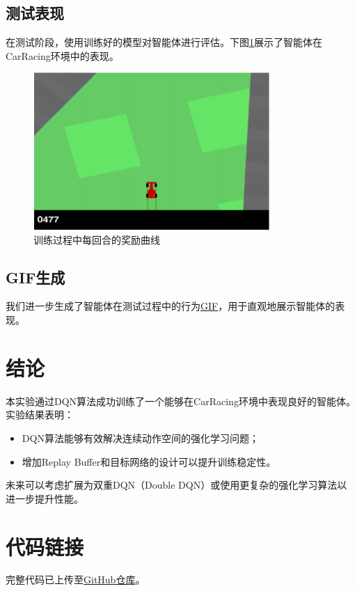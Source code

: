 \documentclass{article}
\begin{document}
\subsection{测试表现}
在测试阶段，使用训练好的模型对智能体进行评估。下图\ref{fig:car_racing_example}展示了智能体在CarRacing环境中的表现。
\begin{figure}[h!]
    \centering
    \includegraphics[width=0.8\textwidth]{./image/Figure_2.png}
    \caption{训练过程中每回合的奖励曲线}
    \label{fig:car_racing_example}
\end{figure}

\subsection{GIF生成}
我们进一步生成了智能体在测试过程中的行为\href{https://github.com/KFCCrazzzyThursday/rl_and_game_theory/blob/main/car_racing.gif}{GIF}，用于直观地展示智能体的表现。
\section{结论}
本实验通过DQN算法成功训练了一个能够在CarRacing环境中表现良好的智能体。实验结果表明：
\begin{itemize}
    \item DQN算法能够有效解决连续动作空间的强化学习问题；
    \item 增加Replay Buffer和目标网络的设计可以提升训练稳定性。
\end{itemize}
未来可以考虑扩展为双重DQN（Double DQN）或使用更复杂的强化学习算法以进一步提升性能。

\section{代码链接}
完整代码已上传至\href{https://github.com/KFCCrazzzyThursday/rl_and_game_theory/tree/main}{GitHub仓库}。
\end{document}
